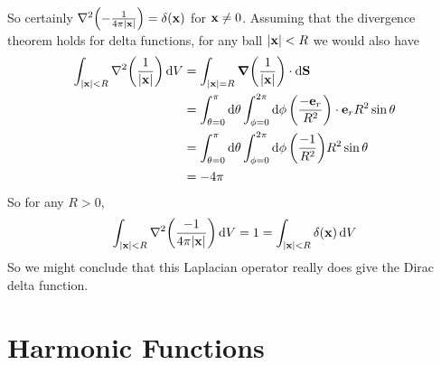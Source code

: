 \documentclass{article}
\begin{document}
So certainly $\laplacian(-\frac{1}{4\pi\abs{\vb x}}) = \delta(\vb x)$ for $\vb x \neq 0$. Assuming that the divergence theorem holds for delta functions, for any ball $\abs{\vb x} < R$ we would also have
\begin{align*}
    \int_{\abs{\vb x} < R} \laplacian(\frac{1}{\abs{\vb x}}) \dd{V} & = \int_{\abs{\vb x} = R} \grad(\frac{1}{\abs{\vb x}}) \cdot \dd{\vb S}                                                          \\
                                                                    & = \int_{\theta = 0}^{\pi} \dd{\theta} \int_{\phi = 0}^{2 \pi} \dd{\phi} \qty(\frac{-\vb e_r}{R^2}) \cdot \vb e_r R^2 \sin\theta \\
                                                                    & = \int_{\theta = 0}^{\pi} \dd{\theta} \int_{\phi = 0}^{2 \pi} \dd{\phi} \qty(\frac{-1}{R^2}) R^2 \sin\theta                     \\
                                                                    & = -4\pi
\end{align*}
So for any $R > 0$,
\[ \int_{\abs{\vb x} < R} \laplacian(\frac{-1}{4\pi\abs{\vb x}}) \dd{V} = 1 = \int_{\abs{\vb x} < R} \delta(\vb x) \dd{V} \]
So we might conclude that this Laplacian operator really does give the Dirac delta function.

\section{Harmonic Functions}
\end{document}
